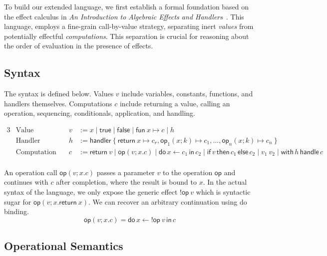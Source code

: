 \documentclass{article}
\theoremstyle{definition}
\theoremstyle{remark}
\newcommand\true{\mathsf{true}}
\newcommand\false{\mathsf{false}}
\newcommand\fun[2]{{\mathsf{fun} \ #1 \mapsto #2}}
\newcommand\handler[1]{{\mathsf{handler} \ \{ \ #1 \ \}}}
\newcommand\ret[1]{{\mathsf{return} \ #1}}
\newcommand\op{\mathsf{op}}
\newcommand{\doin}[3]{\mathsf{do}\, #1 \leftarrow #2\, \mathsf{in}\, #3}
\newcommand{\ifelse}[3]{\mathsf{if}\, #1 \,\mathsf{then} \,#2\, \mathsf{else}\, #3}
\newcommand{\with}[2]{\mathsf{with}\, #1 \,\mathsf{handle} \,#2}
\newcommand{\app}[2]{{#1 \ #2}}
\newcommand\eff{{!}}
\begin{document}
To build our extended language, we first establish a formal foundation based on the effect calculus in \emph{An Introduction to Algebraic Effects and Handlers}~\cite{pretnar_introduction_2015}.
This language, employs a fine-grain call-by-value strategy, separating inert \emph{values} from potentially effectful \emph{computations}.
This separation is crucial for reasoning about the order of evaluation in the presence of effects.

\subsection{Syntax}

The syntax is defined below. Values $v$ include variables, constants, functions, and handlers themselves.
Computations $c$ include returning a value, calling an operation, sequencing, conditionals, application, and handling.

\begin{alignat*}{3}
  &\text{Value} \quad & v &:= x \mid \true \mid \false \mid \fun x c \mid h \\
  &\text{Handler} \quad & h &:= \handler{ \ret{x} \mapsto c_r, \op_1(x;k) \mapsto c_1, \dots, \op_n(x;k) \mapsto c_n } \\
  &\text{Computation} \quad & c &:= \ret{v} \mid \op(v; x.c) \mid \doin{x}{c_1}{c_2} \mid \ifelse{v}{c_1}{c_2} \mid \app{v_1}{v_2} \mid \with{h}{c} \\
\end{alignat*}

An operation call $\op(v; x.c)$ passes a parameter $v$ to the operation $\op$ and continues with $c$ after completion, where the result is bound to $x$.
In the actual syntax of the language, we only expose the generic effect $\eff\op \ v$ which is syntactic sugar for $\op(v; x.\ret{x})$.
We can recover an arbitrary continuation using do binding.
\[
  \op(v; x.c) = \doin{x}{\eff\op \ v}{c}
\]

\subsection{Operational Semantics}
\end{document}
